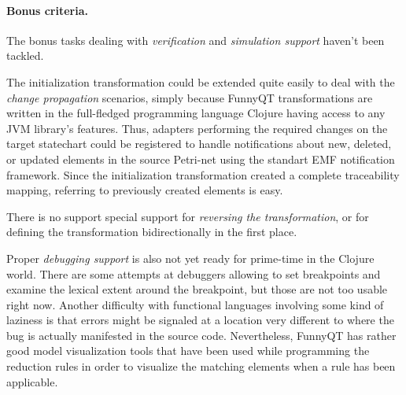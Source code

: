 \documentclass[11pt]{article}
\begin{document}
\paragraph{Bonus criteria.}

The bonus tasks dealing with \emph{verification} and \emph{simulation support}
haven't been tackled.

The initialization transformation could be extended quite easily to deal with
the \emph{change propagation} scenarios, simply because FunnyQT transformations
are written in the full-fledged programming language Clojure having access to
any JVM library's features.  Thus, adapters performing the required changes on
the target statechart could be registered to handle notifications about new,
deleted, or updated elements in the source Petri-net using the standart EMF
notification framework.  Since the initialization transformation created a
complete traceability mapping, referring to previously created elements is
easy.

There is no support special support for \emph{reversing the transformation}, or
for defining the transformation bidirectionally in the first place.

Proper \emph{debugging support} is also not yet ready for prime-time in the
Clojure world.  There are some attempts at debuggers allowing to set
breakpoints and examine the lexical extent around the breakpoint, but those are
not too usable right now.  Another difficulty with functional languages
involving some kind of laziness is that errors might be signaled at a location
very different to where the bug is actually manifested in the source code.
Nevertheless, FunnyQT has rather good model visualization tools that have been
used while programming the reduction rules in order to visualize the matching
elements when a rule has been applicable.





\end{document}
